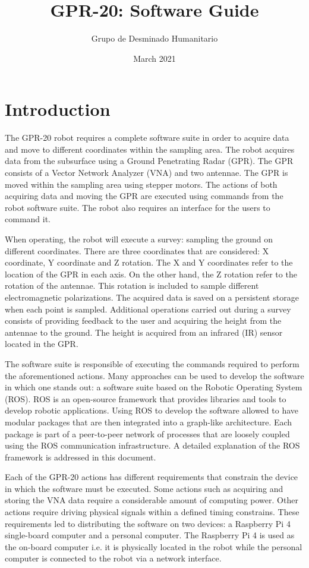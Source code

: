 \documentclass{article}
\title{GPR-20: Software Guide}
\author{Grupo de Desminado Humanitario}
\date{March 2021}
\begin{document}


\newpage
\section{Introduction}
The GPR-20 robot requires a complete software suite in order to acquire data and move to different coordinates within the sampling area. The robot acquires data from the subsurface using a Ground Penetrating Radar (GPR). The GPR consists of a Vector Network Analyzer (VNA) and two antennae. The GPR is moved within the sampling area using stepper motors. The actions of both acquiring data and moving the GPR are executed using commands from the robot software suite. The robot also requires an interface for the users to command it.

When operating, the robot will execute a survey: sampling the ground on different coordinates. There are three coordinates that are considered: X coordinate, Y coordinate and Z rotation. The X and Y coordinates refer to the location of the GPR in each axis. On the other hand, the Z rotation refer to the rotation of the antennae. This rotation is included to sample different electromagnetic polarizations. The acquired data is saved on a persistent storage when each point is sampled. Additional operations carried out during a survey consists of providing feedback to the user and acquiring the height from the antennae to the ground. The height is acquired from an infrared (IR) sensor located in the GPR.

The software suite is responsible of executing the commands required to perform the aforementioned actions. Many approaches can be used to develop the software in which one stands out: a software suite based on the Robotic Operating System (ROS). ROS is an open-source framework that provides libraries and tools to develop robotic applications. Using ROS to develop the software allowed to have modular packages that are then integrated into a graph-like architecture. Each package is part of a peer-to-peer network of processes that are loosely coupled using the ROS communication infrastructure. A detailed explanation of the ROS framework is addressed in this document.

Each of the GPR-20 actions has different requirements that constrain the device in which the software must be executed. Some actions such as acquiring and storing the VNA data require a considerable amount of computing power. Other actions require driving physical signals within a defined timing constrains. These requirements led to distributing the software on two devices: a Raspberry Pi 4 single-board computer and a personal computer. The Raspberry Pi 4 is used as the on-board computer i.e. it is physically located in the robot while the personal computer is connected to the robot via a network interface.
\end{document}
